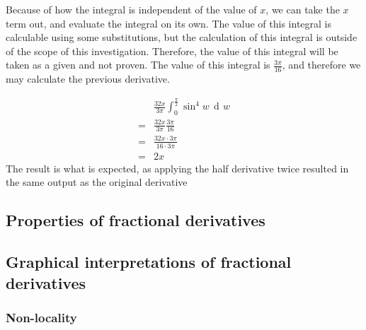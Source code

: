\documentclass{article}
\DeclareMathOperator{\di}{\,d\!}
\begin{document}
Because of how the integral is independent of the value of $x$, we can take the
$x$ term out, and evaluate the integral on its own. The value of this integral
is calculable using some substitutions, but the calculation of this integral is
outside of the scope of this investigation. Therefore, the value of this
integral will be taken as a given and not proven. The value of this integral is
$\frac{3\pi}{16}$, and therefore we may calculate the previous derivative.

\begin{align*}
	&\frac{32x}{3\pi} \int_0^{\frac{\pi}{2}} \sin^4w \di w \\
	=&\frac{32x}{3\pi} \frac{3\pi}{16} \\
	=&\frac{32x\cdot3\pi}{16\cdot 3\pi} \\
	=&2x
\end{align*}
The result is what is expected, as applying the half derivative twice resulted
in the same output as the original derivative

\subsection{Properties of fractional derivatives}
\subsection{Graphical interpretations of fractional derivatives}
\subsubsection{Non-locality}
\end{document}
